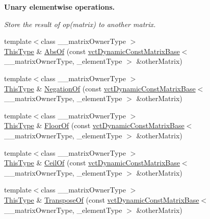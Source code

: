\begin{Indent}{\bf Unary elementwise operations.}\par
{\em Store the result of op(matrix) to another matrix. }\begin{DoxyCompactItemize}
\item 
{\footnotesize template$<$class \+\_\+\+\_\+matrix\+Owner\+Type $>$ }\\\hyperlink{classvct_dynamic_const_matrix_base_ac4ff48cbe4d9de3fdef5a02447ffb9db}{This\+Type} \& \hyperlink{classvct_dynamic_matrix_base_a16665be39341b53c42ad7068cf71fa92}{Abs\+Of} (const \hyperlink{classvct_dynamic_const_matrix_base}{vct\+Dynamic\+Const\+Matrix\+Base}$<$ \+\_\+\+\_\+matrix\+Owner\+Type, \+\_\+element\+Type $>$ \&other\+Matrix)
\item 
{\footnotesize template$<$class \+\_\+\+\_\+matrix\+Owner\+Type $>$ }\\\hyperlink{classvct_dynamic_const_matrix_base_ac4ff48cbe4d9de3fdef5a02447ffb9db}{This\+Type} \& \hyperlink{classvct_dynamic_matrix_base_a7252cdf3d1df1283275b08c2adf43a80}{Negation\+Of} (const \hyperlink{classvct_dynamic_const_matrix_base}{vct\+Dynamic\+Const\+Matrix\+Base}$<$ \+\_\+\+\_\+matrix\+Owner\+Type, \+\_\+element\+Type $>$ \&other\+Matrix)
\item 
{\footnotesize template$<$class \+\_\+\+\_\+matrix\+Owner\+Type $>$ }\\\hyperlink{classvct_dynamic_const_matrix_base_ac4ff48cbe4d9de3fdef5a02447ffb9db}{This\+Type} \& \hyperlink{classvct_dynamic_matrix_base_acd8d8f4a2697c2493859604599a323a4}{Floor\+Of} (const \hyperlink{classvct_dynamic_const_matrix_base}{vct\+Dynamic\+Const\+Matrix\+Base}$<$ \+\_\+\+\_\+matrix\+Owner\+Type, \+\_\+element\+Type $>$ \&other\+Matrix)
\item 
{\footnotesize template$<$class \+\_\+\+\_\+matrix\+Owner\+Type $>$ }\\\hyperlink{classvct_dynamic_const_matrix_base_ac4ff48cbe4d9de3fdef5a02447ffb9db}{This\+Type} \& \hyperlink{classvct_dynamic_matrix_base_ac5332599950a05e2f87bd1d94798adba}{Ceil\+Of} (const \hyperlink{classvct_dynamic_const_matrix_base}{vct\+Dynamic\+Const\+Matrix\+Base}$<$ \+\_\+\+\_\+matrix\+Owner\+Type, \+\_\+element\+Type $>$ \&other\+Matrix)
\item 
{\footnotesize template$<$class \+\_\+\+\_\+matrix\+Owner\+Type $>$ }\\\hyperlink{classvct_dynamic_const_matrix_base_ac4ff48cbe4d9de3fdef5a02447ffb9db}{This\+Type} \& \hyperlink{classvct_dynamic_matrix_base_a232c2b58e0cb3535090e8810f9e5860b}{Transpose\+Of} (const \hyperlink{classvct_dynamic_const_matrix_base}{vct\+Dynamic\+Const\+Matrix\+Base}$<$ \+\_\+\+\_\+matrix\+Owner\+Type, \+\_\+element\+Type $>$ \&other\+Matrix)
\end{DoxyCompactItemize}
\end{Indent}
